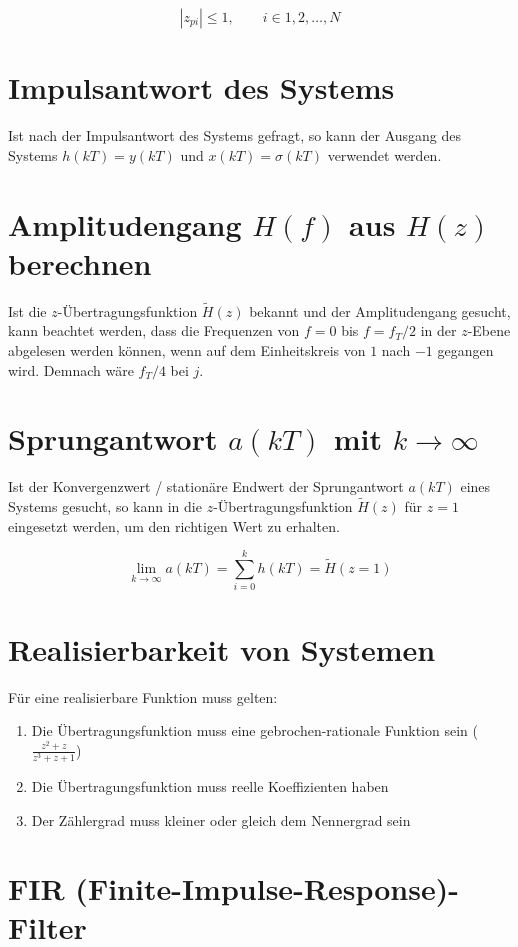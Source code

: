 \documentclass[twoside,10pt,a5paper]{scrartcl}
\begin{document}
\[|z_{pi}| \leq 1, \qquad i \in 1, 2, \ldots , N\]

\section{Impulsantwort des Systems}

Ist nach der Impulsantwort des Systems gefragt, so kann der Ausgang des Systems \(h(kT) = y(kT)\) und \(x(kT) = \sigma(kT)\) verwendet werden. 

\section{Amplitudengang $H(f)$ aus $H(z)$ berechnen}

Ist die \(z\)-Übertragungsfunktion \(\tilde{H}(z)\) bekannt und der Amplitudengang gesucht, kann beachtet werden, dass die Frequenzen von \(f = 0\) bis \(f = f_T/2\) in der \(z\)-Ebene abgelesen werden können, wenn auf dem Einheitskreis von \(1\) nach \(-1\) gegangen wird. Demnach wäre \(f_T/4\) bei \(j\).

\section{Sprungantwort $a(kT)$ mit $k \rightarrow \infty$}

Ist der Konvergenzwert / stationäre Endwert der Sprungantwort \(a(kT)\) eines Systems gesucht, so kann in die \(z\)-Übertragungsfunktion \(\tilde{H}(z)\) für \(z = 1\) eingesetzt werden, um den richtigen Wert zu erhalten.

\[\lim_{k \rightarrow \infty}a(kT) = \sum_{i=0}^k h(kT) = \tilde{H}(z = 1)\]

\section{Realisierbarkeit von Systemen}

Für eine realisierbare Funktion muss gelten:

\begin{enumerate}
\item Die Übertragungsfunktion muss eine gebrochen-rationale Funktion sein (\(\frac{z^2+z}{z^3+z+1}\))
\item Die Übertragungsfunktion muss reelle Koeffizienten haben
\item Der Zählergrad muss kleiner oder gleich dem Nennergrad sein
\end{enumerate}

\section{FIR (Finite-Impulse-Response)-Filter}
\end{document}
